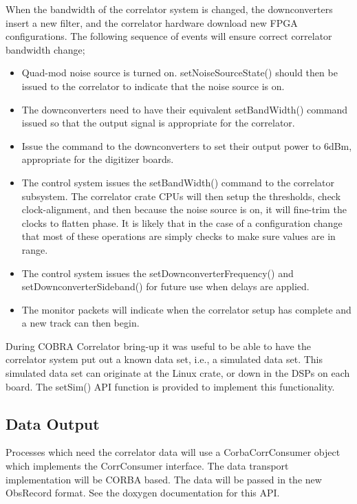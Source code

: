 \documentclass[11pt]{article}
\begin{document}
\vskip5mm

When the bandwidth of the correlator system is changed, the
downconverters insert a new filter, and the correlator hardware download new FPGA configurations. The following sequence of events will ensure correct correlator bandwidth change;
%
\begin{itemize}
\item Quad-mod noise source is turned on.
 setNoiseSourceState() should then be issued to the correlator to indicate that the noise source is on.
\item The downconverters need to have their equivalent setBandWidth() command issued so that the output signal
is appropriate for the correlator.
\item Issue the command to the downconverters to set their output power to 6dBm, appropriate for the digitizer boards.
\item The control system issues the setBandWidth() command to the correlator subsystem. The correlator crate CPUs will
then setup the thresholds, check clock-alignment, and 
then because the noise source is on, it will fine-trim
the clocks to flatten phase. It is likely that in the
case of a configuration change that most of these operations
are simply checks to make sure values are in range.
\item The control system issues the setDownconverterFrequency() and
setDownconverterSideband() for future use when delays are applied.
\item The monitor packets will indicate when the
correlator setup has complete and a new track can then begin.
\end{itemize}

\vskip5mm

During COBRA Correlator bring-up it was useful to be able to have the
correlator system put out a known data set, i.e., a simulated data set. This simulated data set can originate
at the Linux crate, or down in the DSPs on each board.
The setSim() API function is provided to implement this
functionality.


\subsection{Data Output}
Processes which need the correlator data will use a CorbaCorrConsumer object
which implements the CorrConsumer interface. The data transport implementation
will be CORBA based. The data will be passed in the new ObsRecord
format. See the doxygen documentation for this API.
\end{document}
